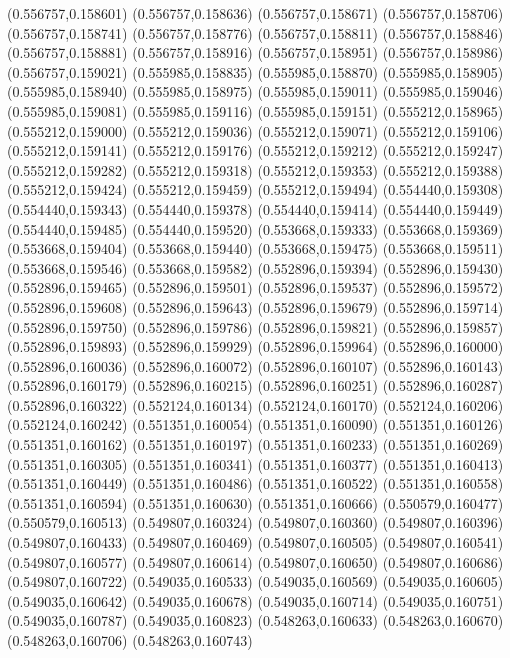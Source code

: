 (0.556757,0.158601)
(0.556757,0.158636)
(0.556757,0.158671)
(0.556757,0.158706)
(0.556757,0.158741)
(0.556757,0.158776)
(0.556757,0.158811)
(0.556757,0.158846)
(0.556757,0.158881)
(0.556757,0.158916)
(0.556757,0.158951)
(0.556757,0.158986)
(0.556757,0.159021)
(0.555985,0.158835)
(0.555985,0.158870)
(0.555985,0.158905)
(0.555985,0.158940)
(0.555985,0.158975)
(0.555985,0.159011)
(0.555985,0.159046)
(0.555985,0.159081)
(0.555985,0.159116)
(0.555985,0.159151)
(0.555212,0.158965)
(0.555212,0.159000)
(0.555212,0.159036)
(0.555212,0.159071)
(0.555212,0.159106)
(0.555212,0.159141)
(0.555212,0.159176)
(0.555212,0.159212)
(0.555212,0.159247)
(0.555212,0.159282)
(0.555212,0.159318)
(0.555212,0.159353)
(0.555212,0.159388)
(0.555212,0.159424)
(0.555212,0.159459)
(0.555212,0.159494)
(0.554440,0.159308)
(0.554440,0.159343)
(0.554440,0.159378)
(0.554440,0.159414)
(0.554440,0.159449)
(0.554440,0.159485)
(0.554440,0.159520)
(0.553668,0.159333)
(0.553668,0.159369)
(0.553668,0.159404)
(0.553668,0.159440)
(0.553668,0.159475)
(0.553668,0.159511)
(0.553668,0.159546)
(0.553668,0.159582)
(0.552896,0.159394)
(0.552896,0.159430)
(0.552896,0.159465)
(0.552896,0.159501)
(0.552896,0.159537)
(0.552896,0.159572)
(0.552896,0.159608)
(0.552896,0.159643)
(0.552896,0.159679)
(0.552896,0.159714)
(0.552896,0.159750)
(0.552896,0.159786)
(0.552896,0.159821)
(0.552896,0.159857)
(0.552896,0.159893)
(0.552896,0.159929)
(0.552896,0.159964)
(0.552896,0.160000)
(0.552896,0.160036)
(0.552896,0.160072)
(0.552896,0.160107)
(0.552896,0.160143)
(0.552896,0.160179)
(0.552896,0.160215)
(0.552896,0.160251)
(0.552896,0.160287)
(0.552896,0.160322)
(0.552124,0.160134)
(0.552124,0.160170)
(0.552124,0.160206)
(0.552124,0.160242)
(0.551351,0.160054)
(0.551351,0.160090)
(0.551351,0.160126)
(0.551351,0.160162)
(0.551351,0.160197)
(0.551351,0.160233)
(0.551351,0.160269)
(0.551351,0.160305)
(0.551351,0.160341)
(0.551351,0.160377)
(0.551351,0.160413)
(0.551351,0.160449)
(0.551351,0.160486)
(0.551351,0.160522)
(0.551351,0.160558)
(0.551351,0.160594)
(0.551351,0.160630)
(0.551351,0.160666)
(0.550579,0.160477)
(0.550579,0.160513)
(0.549807,0.160324)
(0.549807,0.160360)
(0.549807,0.160396)
(0.549807,0.160433)
(0.549807,0.160469)
(0.549807,0.160505)
(0.549807,0.160541)
(0.549807,0.160577)
(0.549807,0.160614)
(0.549807,0.160650)
(0.549807,0.160686)
(0.549807,0.160722)
(0.549035,0.160533)
(0.549035,0.160569)
(0.549035,0.160605)
(0.549035,0.160642)
(0.549035,0.160678)
(0.549035,0.160714)
(0.549035,0.160751)
(0.549035,0.160787)
(0.549035,0.160823)
(0.548263,0.160633)
(0.548263,0.160670)
(0.548263,0.160706)
(0.548263,0.160743)
